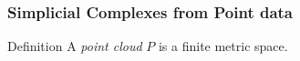 \documentclass[usenames,dvipsnames,aspectratio=1610]{beamer}
\begin{document}
\begin{frame}
  \frametitle{Simplicial Complexes from Point data}
  \begin{block}{Definition}
    A {\em point cloud} $P$ is a finite metric space.
  \end{block}

  \begin{center}

\end{center}
\end{frame}
\end{document}
